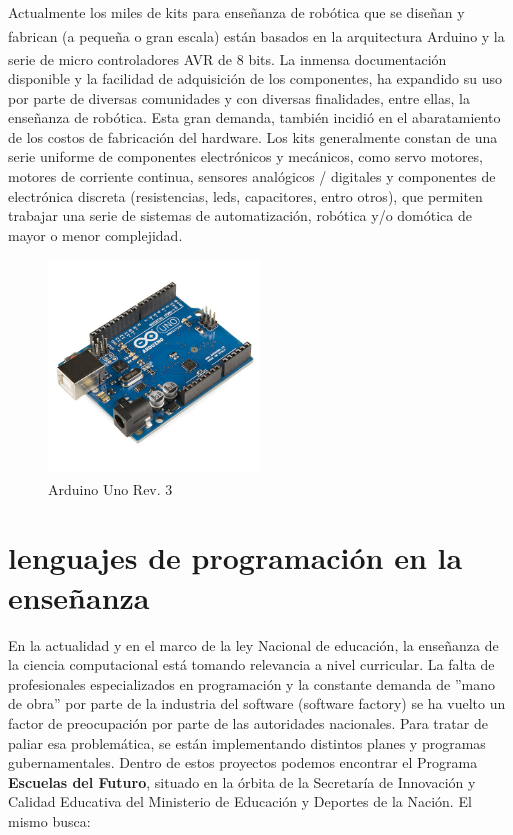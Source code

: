 Actualmente los miles de kits para enseñanza de robótica que se diseñan y fabrican (a pequeña o gran escala) están basados en la arquitectura Arduino\textsuperscript{\texttrademark} y la serie de micro controladores AVR\textsuperscript{\textregistered} de 8 bits. La inmensa documentación disponible y la facilidad de adquisición de los componentes, ha expandido su uso por parte de diversas comunidades y con diversas finalidades, entre ellas, la enseñanza de robótica. Esta gran demanda,  también incidió en el abaratamiento de los costos de fabricación del hardware. Los kits generalmente constan de una serie uniforme de componentes electrónicos y mecánicos, como servo motores, motores de corriente continua, sensores analógicos / digitales y componentes de electrónica discreta (resistencias, leds, capacitores, entro otros), que permiten trabajar una serie de sistemas de automatización, robótica y/o domótica de mayor o menor complejidad.

\begin{figure}[htb]
  \begin{center}
    \includegraphics[width=0.5\textwidth]{figuras/Arduino_Uno_-_R3.jpg}
    \caption[Caption for LOF]{Arduino\textsuperscript{\texttrademark} Uno Rev. 3}
       
   \label{fig:arduinouno }
  \end{center}
\end{figure}

\section{lenguajes de programación en la enseñanza}

En la actualidad y en el marco de la ley Nacional de educación, la enseñanza de la ciencia computacional está tomando relevancia a nivel curricular. La falta de profesionales especializados en programación y la constante demanda de ''mano de obra'' por parte de la industria del software (software factory) se ha vuelto un factor de preocupación por parte de las autoridades nacionales. Para tratar de paliar esa problemática, se están implementando distintos planes y programas gubernamentales. Dentro de estos proyectos podemos encontrar el Programa \textbf{Escuelas del Futuro}, situado en la órbita de la Secretaría de Innovación y Calidad Educativa del Ministerio de Educación y Deportes de la Nación. El mismo busca: 

